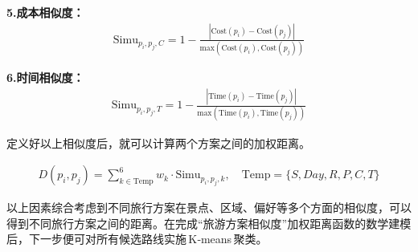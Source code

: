 \noindent\textbf{5.成本相似度：}
\begin{equation}
  \begin{aligned}
    \text{Simu}_{p_{i},p_{j},C} = 1-\frac{|\text{Cost}(p_{i})-\text{Cost}(p_{j})|}{\text{max}(\text{Cost}(p_{i}),\text{Cost}(p_{j}))}
  \end{aligned}
\end{equation}

\noindent\textbf{6.时间相似度：}
\begin{equation}
  \begin{aligned}
    \text{Simu}_{p_{i},p_{j},T} = 1-\frac{|\text{Time}(p_{i})-\text{Time}(p_{j})|}{\text{max}(\text{Time}(p_{i}),\text{Time}(p_{j}))}
  \end{aligned}
\end{equation}

定义好以上相似度后，就可以计算两个方案之间的加权距离。

\begin{equation}
  \begin{aligned}
    D(p_{i},p_{j}) = \sum_{k\in \text{Temp}}^{6}w_{k}\cdot\text{Simu}_{p_{i},p_{j},k},\quad \text{Temp}=\{S,Day,R,P,C,T\}
  \end{aligned}
\end{equation}

以上因素综合考虑到不同旅行方案在景点、区域、偏好等多个方面的相似度，可以得到不同旅行方案之间的距离。在完成“旅游方案相似度”加权距离函数的数学建模后，下一步便可对所有候选路线实施 K‑means 聚类。





